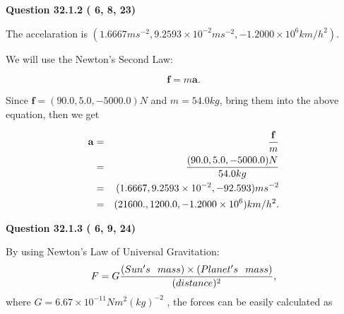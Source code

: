 \documentclass[12pt]{article}
\begin{document}
 
 
  
\vspace{0.2in}
  
{\textbf{\Large{Question
32.1.2 
 (          6,          8,         23)
}}}
  
  
 
 
\noindent{}
 
 
The accelaration is
$(
1.6667ms^{-2},
9.2593 \times 10^{-2}ms^{-2},
-1.2000 \times 10^{6}km/h^2
).
$
 
 
 
 
 
 
\noindent{}

We will use the Newton's Second Law:
 
\[
\mathbf{f}=m\mathbf{a}.
\]
 
Since $\mathbf{f}=( %
90.0,  %
5.0,  %
-5000.0 )N$
and $m= %
54.0kg$, bring them into the above equation, then we get
 
\begin{eqnarray*}
\mathbf{a}&=&\frac{\mathbf{f}}m  \\
&=&\frac{(
90.0 ,
5.0 ,
-5000.0 )N
}{ %
54.0 kg}  \\
&=&(
1.6667 ,
9.2593 \times 10^{-2},
-92.593
)ms^{-2} \\
&=&(
21600. ,
1200.0 ,
-1.2000 \times 10^{6}
)km/h^2.
\end{eqnarray*}
 
 
 
  
\vspace{0.2in}
  
{\textbf{\Large{Question
32.1.3 
 (          6,          9,         24)
}}}
  
  
 
 
\noindent{}

By using Newton's Law of Universal Gravitation:
\[
F=G \frac{(Sun's \hspace{0.1in} mass) \times (Planet's \hspace{0.1in} mass)} { (distance)^2},
\]
where
$ G= %
6.67 \times 10^{-11}N m^{2}(kg)^{-2}$ , the forces can be easily calculated as
 
\vspace{0.2in}
 
\end{document}

